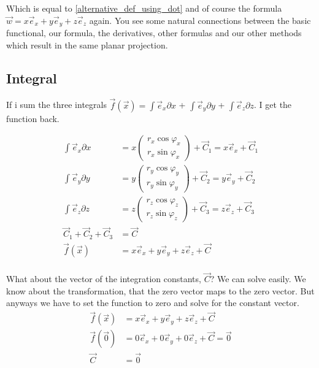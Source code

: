 \documentclass[a4paper]{article}
\begin{document}
Which is equal to \ref{alternative_def_using_dot} and of course the formula $\vec{w} = x\vec{e}_{x}+y\vec{e}_{y}+z\vec{e}_{z}$ again. You see some natural connections between the basic functional, our formula, the derivatives, other formulas and our other methods which result in the same planar projection.\\

\subsection{Integral}

If i sum the three integrals $\vec{f}(\vec{x}) = \int\vec{e}_{x}\partial{x}$ + $\int\vec{e}_{y}\partial{y}$ + $\int\vec{e}_{z}\partial{z}$. I get the function back. 

\begin{displaymath}
\begin{align}
\int\vec{e}_{x}\partial{x} &= x\begin{pmatrix}r_x\cos\varphi_x\\r_x\sin\varphi_x\end{pmatrix} + \vec{C}_{1} = x\vec{e}_{x} + \vec{C}_{1}\\
\int\vec{e}_{y}\partial{y} &= y\begin{pmatrix}r_y\cos\varphi_y\\r_y\sin\varphi_y\end{pmatrix} + \vec{C}_{2} = y\vec{e}_{y} + \vec{C}_{2}\\
\int\vec{e}_{z}\partial{z} &= z\begin{pmatrix}r_z\cos\varphi_z\\r_z\sin\varphi_z\end{pmatrix} + \vec{C}_{3} = z\vec{e}_{z} + \vec{C}_{3}\\
\vec{C}_{1} + \vec{C}_{2} + \vec{C}_{3} &= \vec{C}\\
\vec{f}(\vec{x}) &= x\vec{e}_{x} +y\vec{e}_{y} +z\vec{e}_{z} + \vec{C}\\
\end{align}
\end{displaymath}

What about the vector of the integration constants, $\vec{C}$? We can solve easily. We know about the transformation, that the zero vector maps to the zero vector. But anyways we have to set the function to zero and solve for the constant vector.\\

\begin{displaymath}
\begin{align}
\vec{f}(\vec{x}) &= x\vec{e}_{x} + y\vec{e}_{y} + z\vec{e}_{z} + \vec{C}\\
\vec{f}(\vec{0}) &= 0\vec{e}_{x} + 0\vec{e}_{y} + 0\vec{e}_{z} + \vec{C} = \vec{0}\\
\vec{C} &= \vec{0}
\end{align}
\end{displaymath}
\end{document}
